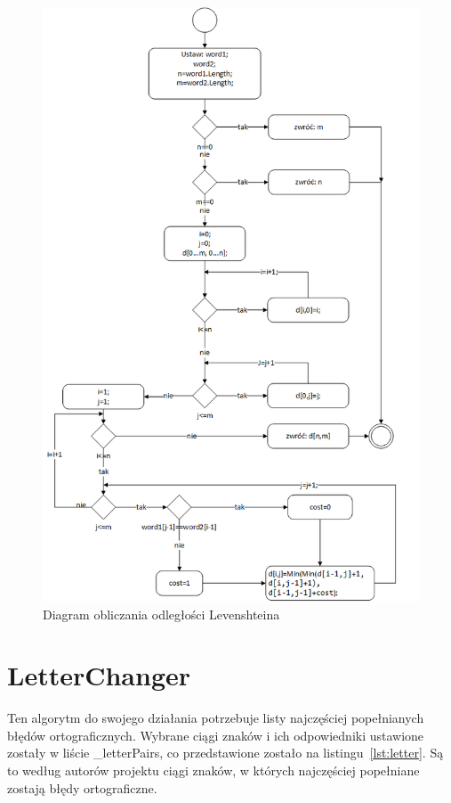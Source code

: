 \begin{figure} [H]
	\centering
	\includegraphics[width=1\linewidth]{rozdzial02/Levenstein-Count.png}
	\caption{Diagram obliczania odległości Levenshteina}
	\label{fig:Lev-Count}
\end{figure}


\section{LetterChanger}
\label{chap:Letter}
Ten algorytm do swojego działania potrzebuje listy najczęściej popełnianych błędów ortograficznych. Wybrane ciągi znaków i ich odpowiedniki ustawione zostały w liście \_letterPairs, co przedstawione zostało na listingu~\ref{lst:letter}. Są to według autorów projektu ciągi znaków, w których najczęściej popełniane zostają błędy ortograficzne. 


